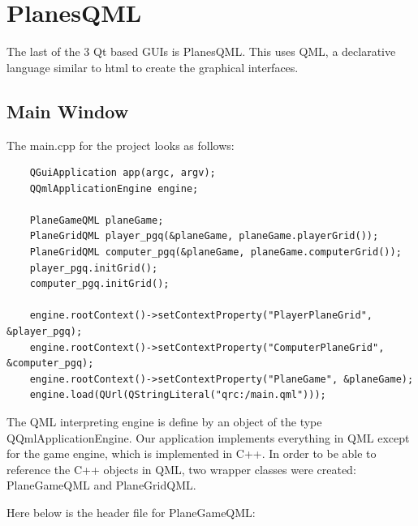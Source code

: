 \section{PlanesQML}

The last of the 3 Qt based GUIs is PlanesQML. This uses QML, a declarative language similar to html to create the graphical interfaces.

\subsection{Main Window}

The main.cpp for the project looks as follows:

\begin{lstlisting}
	QGuiApplication app(argc, argv);
	QQmlApplicationEngine engine;
	
	PlaneGameQML planeGame;
	PlaneGridQML player_pgq(&planeGame, planeGame.playerGrid());
	PlaneGridQML computer_pgq(&planeGame, planeGame.computerGrid());
	player_pgq.initGrid();
	computer_pgq.initGrid();
	
	engine.rootContext()->setContextProperty("PlayerPlaneGrid", &player_pgq);
	engine.rootContext()->setContextProperty("ComputerPlaneGrid", &computer_pgq);
	engine.rootContext()->setContextProperty("PlaneGame", &planeGame);
	engine.load(QUrl(QStringLiteral("qrc:/main.qml")));
\end{lstlisting}

The QML interpreting engine is define by an object of the type QQmlApplicationEngine. Our application implements everything in QML except for the game engine, which is implemented in C++. In order to be able to reference the C++ objects in QML, two wrapper classes were created: PlaneGameQML and PlaneGridQML. 

Here below is the header file for PlaneGameQML:

